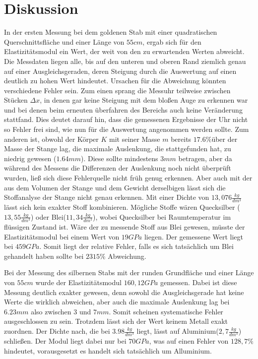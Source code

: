 \section{Diskussion}
\label{sec:Diskussion}

In der ersten Messung bei dem goldenen Stab mit einer quadratischen Querschnittsfläche und einer Länge von $55cm$, ergab sich für den Elastizitätsmodul ein Wert, der weit von den zu erwartenden Werten abweicht. Die Messdaten liegen alle, bis auf den unteren und oberen Rand ziemlich genau auf einer Ausgleichsgeraden, deren Steigung durch die Auswertung auf einen deutlich zu hohen Wert hindeutet. Ursachen für die Abweichung könnten verschiedene Fehler sein. Zum einen sprang die Messuhr teilweise zwischen Stücken $ \Delta x$, in denen gar keine Steigung mit dem bloßen Auge zu erkennen war und bei denen beim erneuten überfahren des Bereichs auch keine Veränderung stattfand. Dies deutet darauf hin, dass die gemessenen Ergebnisse der Uhr nicht so Fehler frei sind, wie nun für die Auswertung angenommen werden sollte. 
Zum anderen ist, obwohl der Körper $K$ mit seiner Masse $m$ bereits $17.6\%$über der Masse der Stange lag, die maximale Auslenkung, die stattgefunden hat, zu niedrig gewesen ($1.64 mm$). Diese sollte mindestens $3mm$ betragen, aber da während des Messens die Differenzen der Auslenkung noch nicht überprüft wurden, ließ sich diese Fehlerquelle nicht früh genug erkennen. 
Aber auch mit der aus dem Volumen der Stange und dem Gewicht derselbigen lässt sich die Stoffanalyse der Stange nicht genau erkennen. Mit einer Dichte von $13,076 \frac{kg}{dm^{3}}$ lässt sich kein exakter Stoff kombinieren. Mögliche Stoffe wären Quecksilber ($13,55 \frac{kg}{dm^{3}}$) oder Blei($11,34 \frac{kg}{dm^{3}}$), wobei Quecksilber bei Raumtemperatur im flüssigen Zustand ist. Wäre der zu messende Stoff aus Blei gewesen, müsste der Elastizitätsmodul bei einem Wert von $19GPa$ liegen. Der gemessene Wert liegt bei $459 GPa$. Somit liegt der relative Fehler, falls es sich tatsächlich um Blei gehandelt haben sollte bei $2315\%$ Abweichung. 

Bei der Messung des silbernen Stabs mit der runden Grundfläche und einer Länge von $55cm$ wurde der Elastizitätsmodul $160,12 GPa$ gemessen. Dabei ist diese Messung deutlich exakter gewesen, denn sowohl die Ausgleichsgerade hat keine Werte die wirklich abweichen, aber auch die maximale Auslenkung lag bei $6.23mm$ also zwischen $3$ und $7mm$. Somit scheinen systematische Fehler ausgeschlossen zu sein. Trotzdem lässt sich der Wert keinem Metall exakt zuordnen. Der Dichte nach, die bei $3.98 \frac{kg}{dm^3}$ liegt, lässt auf Aluminium($2,7\frac{kg}{dm^3}$) schließen. Der Modul liegt dabei nur bei $70GPa$, was auf einen Fehler von $128,7\%$ hindeutet, vorausgesetzt es handelt sich tatsächlich um Alluminium.

